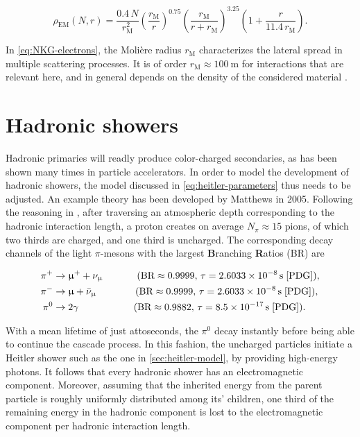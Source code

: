 \begin{equation}
\label{eq:NKG-electrons}
\rho_\text{EM}(N, r)=\frac{0.4\,N}{r_\text{M}^2} \left(\frac{r_\text{M}}{r}\right)^{0.75} \left(\frac{r_\text{M}}{r+r_\text{M}}\right)^{3.25}\left(1+\frac{r}{11.4\,r_\text{M}} \right).
\end{equation}

In \autoref{eq:NKG-electrons}, the Molière radius $r_\text{M}$ characterizes the lateral spread in multiple scattering processes. It is of order 
$r_\text{M}\approx\SI{100}{\meter}$ for interactions that are relevant here, and in general depends on the density of the considered material 
\cite{moliere1947theorie}.

\section{Hadronic showers}
\label{sec:heitler-matthews-model}

Hadronic primaries will readly produce color-charged secondaries, as has been shown many times in particle accelerators. In order to model the development of 
hadronic showers, the model discussed in \autoref{eq:heitler-parameters} thus needs to be adjusted. An example theory has been developed by Matthews in 2005. 
Following the reasoning in \cite{matthews2005heitler}, after traversing an atmospheric depth corresponding to the hadronic interaction length, a proton creates on 
average $N_\pi \approx 15$ pions, of which two thirds are charged, and one third is uncharged. The corresponding decay channels of the light $\pi$-mesons with the 
largest \textbf{B}ranching \textbf{R}atios (BR) are 

\begin{align*}
	\pi^{+} &\rightarrow \upmu^{+} + \nu_\upmu \!\!\!  \qquad\qquad (\text{BR}\approx0.9999,\,\tau=\SI{2.6033e-8}{\second} \; \text{\cite{PDG}}), \\
	\pi^{-} &\rightarrow \upmu + \bar{\nu}_\upmu \qquad\qquad (\text{BR}\approx0.9999,\,\tau=\SI{2.6033e-8}{\second} \; \text{\cite{PDG}}), \\
	\pi^0 &\rightarrow 2\gamma \!\! \qquad\qquad\qquad (\text{BR}\approx0.9882,\,\tau=\SI{8.5e-17}{\second}\; \text{\cite{PDG}}).
\end{align*}

With a mean lifetime of just attoseconds, the $\pi^0$ decay instantly before being able to continue the cascade process. In this fashion, the uncharged particles 
initiate a Heitler shower such as the one in \autoref{sec:heitler-model}, by providing high-energy photons. It follows that every hadronic shower has an 
electromagnetic component. Moreover, assuming that the inherited energy from the parent particle is roughly uniformly distributed among its' children, one third of
the remaining energy in the hadronic component is lost to the electromagnetic component per hadronic interaction length. 

